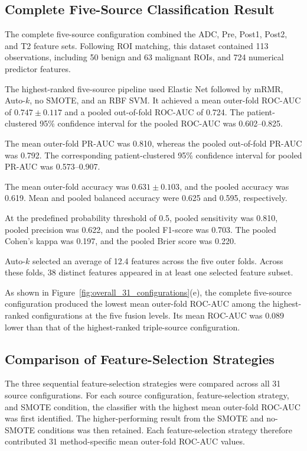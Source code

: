 \documentclass[12pt,twocolumn]{article}
\begin{document}
\subsection{Complete Five-Source Classification Result}
\label{subsec:five_source_results}

The complete five-source configuration combined the ADC, Pre, Post1,
Post2, and T2 feature sets. Following ROI matching, this dataset
contained 113 observations, including 50 benign and 63 malignant ROIs,
and 724 numerical predictor features.

The highest-ranked five-source pipeline used Elastic Net followed by
mRMR, Auto-\(k\), no SMOTE, and an RBF SVM. It achieved a mean
outer-fold ROC-AUC of \(0.747 \pm 0.117\) and a pooled out-of-fold
ROC-AUC of 0.724. The patient-clustered 95\% confidence interval for
the pooled ROC-AUC was 0.602--0.825.

The mean outer-fold PR-AUC was 0.810, whereas the pooled out-of-fold
PR-AUC was 0.792. The corresponding patient-clustered 95\% confidence
interval for pooled PR-AUC was 0.573--0.907.

The mean outer-fold accuracy was \(0.631 \pm 0.103\), and the pooled
accuracy was 0.619. Mean and pooled balanced accuracy were 0.625 and
0.595, respectively.

At the predefined probability threshold of 0.5, pooled sensitivity was
0.810, pooled precision was 0.622, and the pooled F1-score was 0.703.
The pooled Cohen's kappa was 0.197, and the pooled Brier score was
0.220.

Auto-\(k\) selected an average of 12.4 features across the five outer
folds. Across these folds, 38 distinct features appeared in at least
one selected feature subset.

As shown in Figure~\ref{fig:overall_31_configurations}(e), the
complete five-source configuration produced the lowest mean outer-fold
ROC-AUC among the highest-ranked configurations at the five fusion
levels. Its mean ROC-AUC was 0.089 lower than that of the
highest-ranked triple-source configuration.






\subsection{Comparison of Feature-Selection Strategies}
\label{subsec:feature_selection_results}

The three sequential feature-selection strategies were compared
across all 31 source configurations. For each source configuration,
feature-selection strategy, and SMOTE condition, the classifier with
the highest mean outer-fold ROC-AUC was first identified. The
higher-performing result from the SMOTE and no-SMOTE conditions was
then retained. Each feature-selection strategy therefore contributed
31 method-specific mean outer-fold ROC-AUC values.
\end{document}
